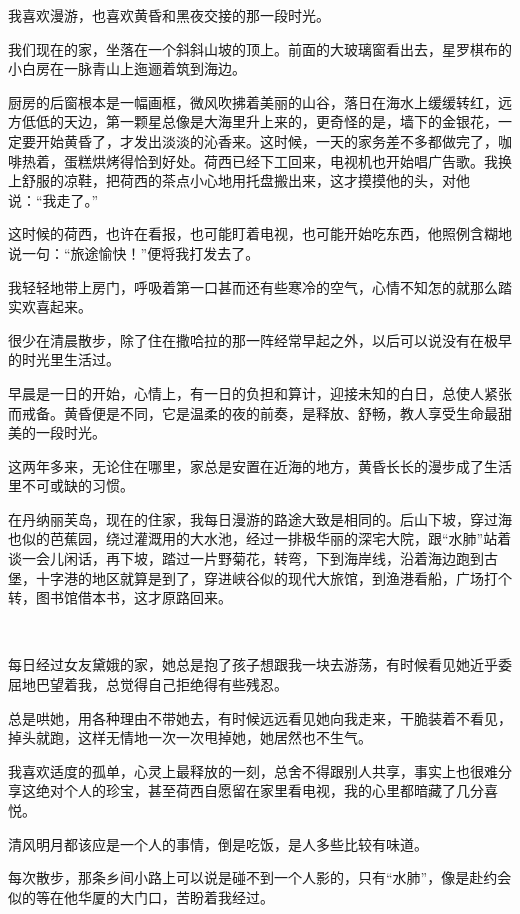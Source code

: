 \par 我喜欢漫游，也喜欢黄昏和黑夜交接的那一段时光。
\par 我们现在的家，坐落在一个斜斜山坡的顶上。前面的大玻璃窗看出去，星罗棋布的小白房在一脉青山上迤逦着筑到海边。
\par 厨房的后窗根本是一幅画框，微风吹拂着美丽的山谷，落日在海水上缓缓转红，远方低低的天边，第一颗星总像是大海里升上来的，更奇怪的是，墙下的金银花，一定要开始黄昏了，才发出淡淡的沁香来。这时候，一天的家务差不多都做完了，咖啡热着，蛋糕烘烤得恰到好处。荷西已经下工回来，电视机也开始唱广告歌。我换上舒服的凉鞋，把荷西的茶点小心地用托盘搬出来，这才摸摸他的头，对他说：“我走了。”
\par 这时候的荷西，也许在看报，也可能盯着电视，也可能开始吃东西，他照例含糊地说一句：“旅途愉快！”便将我打发去了。
\par 我轻轻地带上房门，呼吸着第一口甚而还有些寒冷的空气，心情不知怎的就那么踏实欢喜起来。
\par 很少在清晨散步，除了住在撒哈拉的那一阵经常早起之外，以后可以说没有在极早的时光里生活过。
\par 早晨是一日的开始，心情上，有一日的负担和算计，迎接未知的白日，总使人紧张而戒备。黄昏便是不同，它是温柔的夜的前奏，是释放、舒畅，教人享受生命最甜美的一段时光。
\par 这两年多来，无论住在哪里，家总是安置在近海的地方，黄昏长长的漫步成了生活里不可或缺的习惯。
\par 在丹纳丽芙岛，现在的住家，我每日漫游的路途大致是相同的。后山下坡，穿过海也似的芭蕉园，绕过灌溉用的大水池，经过一排极华丽的深宅大院，跟“水肺”站着谈一会儿闲话，再下坡，踏过一片野菊花，转弯，下到海岸线，沿着海边跑到古堡，十字港的地区就算是到了，穿进峡谷似的现代大旅馆，到渔港看船，广场打个转，图书馆借本书，这才原路回来。
\par  
\par 每日经过女友黛娥的家，她总是抱了孩子想跟我一块去游荡，有时候看见她近乎委屈地巴望着我，总觉得自己拒绝得有些残忍。
\par 总是哄她，用各种理由不带她去，有时候远远看见她向我走来，干脆装着不看见，掉头就跑，这样无情地一次一次甩掉她，她居然也不生气。
\par 我喜欢适度的孤单，心灵上最释放的一刻，总舍不得跟别人共享，事实上也很难分享这绝对个人的珍宝，甚至荷西自愿留在家里看电视，我的心里都暗藏了几分喜悦。
\par 清风明月都该应是一个人的事情，倒是吃饭，是人多些比较有味道。
\par 每次散步，那条乡间小路上可以说是碰不到一个人影的，只有“水肺”，像是赴约会似的等在他华厦的大门口，苦盼着我经过。

